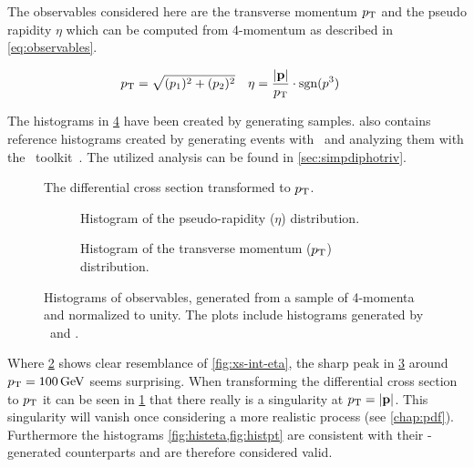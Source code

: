 The observables considered here are the transverse momentum \(p_\mathrm{T}\)
and the pseudo rapidity \(\eta\) which can be computed from 4-momentum
as described in \cref{eq:observables}.

\begin{align}
  \label{eq:observables}
  p_\mathrm{T} &= \sqrt{(p_1)^2+(p_2)^2} & \eta &=
                                         \frac{\abs{\vb{p}}}{p_\mathrm{T}}\cdot\operatorname{sgn}(p^3)
\end{align}

The histograms in \cref{fig:histos} have been created by generating
 samples.  also
contains reference histograms created by generating events with
\sherpa\ and analyzing them with the \rivet\
toolkit~\cite{Bierlich:2019rhm}. The utilized analysis can be found
in \cref{sec:simpdiphotriv}.

\begin{figure}[hb]
  \centering {}
  \caption{\label{fig:diff-xs-pt} The differential cross section
    transformed to \(p_\mathrm{T}\).}
\end{figure}

\begin{figure}[p]
  \centering

  \begin{subfigure}[b]{\textwidth}
    \centering {}
    \caption{\label{fig:histeta} Histogram of the pseudo-rapidity
      (\(\eta\)) distribution.}
  \end{subfigure}
  \begin{subfigure}[b]{\textwidth}
    \centering {}
    \caption{\label{fig:histpt} Histogram of the transverse momentum
      (\(p_\mathrm{T}\)) distribution.}
  \end{subfigure}
  \caption{\label{fig:histos} Histograms of observables, generated
    from a sample of 4-momenta and normalized to unity. The plots
    include histograms generated by \sherpa\ and \rivet.}
\end{figure}

Where \cref{fig:histeta} shows clear resemblance of
\cref{fig:xs-int-eta}, the sharp peak in \cref{fig:histpt} around
\(p_\mathrm{T}=\SI{100}{\giga\electronvolt}\) seems surprising. When
transforming the differential cross section to \(p_\mathrm{T}\) it can be seen
in \cref{fig:diff-xs-pt} that there really is a singularity at
\(p_\mathrm{T} =\abs{\vb{p}}\). This singularity will vanish once considering a
more realistic process (see \cref{chap:pdf}). Furthermore the
histograms \cref{fig:histeta,fig:histpt} are consistent
with their \rivet-generated counterparts and are therefore considered
valid.


